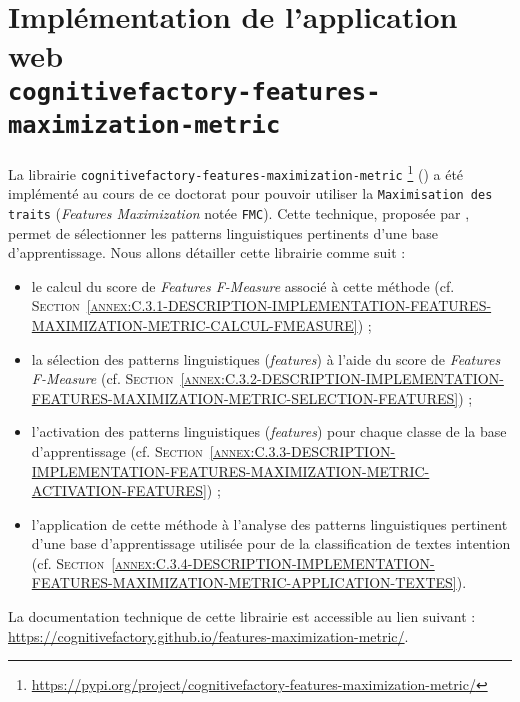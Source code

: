 \section[
		\texttt{cognitivefactory-features-maximization-metric}
	]{
		Implémentation de l'application web \\ \texttt{cognitivefactory-features-maximization-metric}
	}
\label{annex:C.3-DESCRIPTION-IMPLEMENTATION-FEATURES-MAXIMIZATION-METRIC}
	
	La librairie \texttt{cognitivefactory-features-maximization-metric} \footnote{
		\url{https://pypi.org/project/cognitivefactory-features-maximization-metric/}
	} (\cite{schild:2023:cognitivefactory-featuresmaximizationmetric}) a été implémenté au cours de ce doctorat pour pouvoir utiliser la \texttt{Maximisation des traits} (\textit{Features Maximization} notée \texttt{FMC}).
	Cette technique, proposée par \cite{lamirel-etal:2017:novel-approach-feature}, permet de sélectionner les patterns linguistiques pertinents d'une base d'apprentissage.
	Nous allons détailler cette librairie comme suit :
	\begin{itemize}
		\item le calcul du score de \textit{Features F-Measure} associé à cette méthode (cf. \textsc{Section~\ref{annex:C.3.1-DESCRIPTION-IMPLEMENTATION-FEATURES-MAXIMIZATION-METRIC-CALCUL-FMEASURE}}) ;
		\item la sélection des patterns linguistiques (\textit{features}) à l'aide du score de \textit{Features F-Measure} (cf. \textsc{Section~\ref{annex:C.3.2-DESCRIPTION-IMPLEMENTATION-FEATURES-MAXIMIZATION-METRIC-SELECTION-FEATURES}}) ;
		\item l'activation des patterns linguistiques (\textit{features}) pour chaque classe de la base d'apprentissage (cf. \textsc{Section~\ref{annex:C.3.3-DESCRIPTION-IMPLEMENTATION-FEATURES-MAXIMIZATION-METRIC-ACTIVATION-FEATURES}}) ;
		\item l'application de cette méthode à l'analyse des patterns linguistiques pertinent d'une base d'apprentissage utilisée pour de la classification de textes intention (cf. \textsc{Section~\ref{annex:C.3.4-DESCRIPTION-IMPLEMENTATION-FEATURES-MAXIMIZATION-METRIC-APPLICATION-TEXTES}}).
	\end{itemize}
	
	\begin{leftBarInformation}
		La documentation technique de cette librairie est accessible au lien suivant : \url{https://cognitivefactory.github.io/features-maximization-metric/}.
	\end{leftBarInformation}
	

